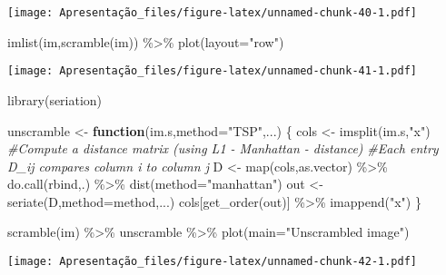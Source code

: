 \documentclass[
]{article}
\newenvironment{Shaded}{\begin{snugshade}}{\end{snugshade}}
\newcommand{\AttributeTok}[1]{\textcolor[rgb]{0.77,0.63,0.00}{#1}}
\newcommand{\CommentTok}[1]{\textcolor[rgb]{0.56,0.35,0.01}{\textit{#1}}}
\newcommand{\ControlFlowTok}[1]{\textcolor[rgb]{0.13,0.29,0.53}{\textbf{#1}}}
\newcommand{\FunctionTok}[1]{\textcolor[rgb]{0.00,0.00,0.00}{#1}}
\newcommand{\NormalTok}[1]{#1}
\newcommand{\OtherTok}[1]{\textcolor[rgb]{0.56,0.35,0.01}{#1}}
\newcommand{\SpecialCharTok}[1]{\textcolor[rgb]{0.00,0.00,0.00}{#1}}
\newcommand{\StringTok}[1]{\textcolor[rgb]{0.31,0.60,0.02}{#1}}
\begin{document}
\texttt{[image: Apresentação\_files/figure-latex/unnamed-chunk-40-1.pdf]}

\begin{Shaded}
\begin{Highlighting}[]
\FunctionTok{imlist}\NormalTok{(im,}\FunctionTok{scramble}\NormalTok{(im)) }\SpecialCharTok{\%\textgreater{}\%} \FunctionTok{plot}\NormalTok{(}\AttributeTok{layout=}\StringTok{"row"}\NormalTok{)}
\end{Highlighting}
\end{Shaded}

\texttt{[image: Apresentação\_files/figure-latex/unnamed-chunk-41-1.pdf]}

\begin{Shaded}
\begin{Highlighting}[]
\FunctionTok{library}\NormalTok{(seriation)}

\NormalTok{unscramble }\OtherTok{\textless{}{-}} \ControlFlowTok{function}\NormalTok{(im.s,}\AttributeTok{method=}\StringTok{"TSP"}\NormalTok{,...)}
\NormalTok{\{}
\NormalTok{    cols }\OtherTok{\textless{}{-}} \FunctionTok{imsplit}\NormalTok{(im.s,}\StringTok{"x"}\NormalTok{)}
    \CommentTok{\#Compute a distance matrix (using L1 {-} Manhattan {-} distance)}
    \CommentTok{\#Each entry D\_ij compares column i to column j  }
\NormalTok{    D }\OtherTok{\textless{}{-}} \FunctionTok{map}\NormalTok{(cols,as.vector) }\SpecialCharTok{\%\textgreater{}\%} \FunctionTok{do.call}\NormalTok{(rbind,.) }\SpecialCharTok{\%\textgreater{}\%} \FunctionTok{dist}\NormalTok{(}\AttributeTok{method=}\StringTok{"manhattan"}\NormalTok{)}
\NormalTok{    out }\OtherTok{\textless{}{-}} \FunctionTok{seriate}\NormalTok{(D,}\AttributeTok{method=}\NormalTok{method,...)}
\NormalTok{    cols[}\FunctionTok{get\_order}\NormalTok{(out)] }\SpecialCharTok{\%\textgreater{}\%} \FunctionTok{imappend}\NormalTok{(}\StringTok{"x"}\NormalTok{) }
\NormalTok{\}}

\FunctionTok{scramble}\NormalTok{(im) }\SpecialCharTok{\%\textgreater{}\%}\NormalTok{ unscramble }\SpecialCharTok{\%\textgreater{}\%} \FunctionTok{plot}\NormalTok{(}\AttributeTok{main=}\StringTok{"Unscrambled image"}\NormalTok{)}
\end{Highlighting}
\end{Shaded}

\texttt{[image: Apresentação\_files/figure-latex/unnamed-chunk-42-1.pdf]}
\end{document}
